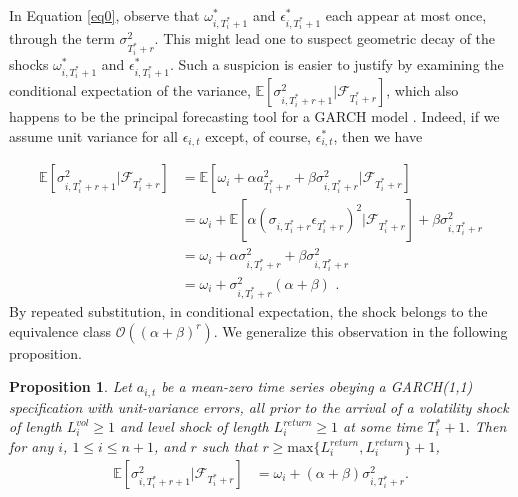 \documentclass{uiucthesis2021}
\newtheorem{prop}{Proposition}
\theoremstyle{definition}
\begin{document}
In Equation \eqref{eq0}, observe that $\omega_{i,T_{i}^{*}+1}^{*}$ and $\epsilon^{*}_{i,T_{i}^{*}+1}$ 
each appear at most once, through the term $\sigma^{2}_{T_{i}^{*}+r}$.  This might lead one to 
suspect  geometric decay of the shocks $\omega_{i,T_{i}^{*}+1}^{*}$ and $\epsilon^{*}_{i,T_{i}^{*}+1}$.  
Such a suspicion is easier to justify by examining the conditional expectation of the variance, 
$\mathbb{E}[ \sigma^{2}_{i,T_{i}^{*}+r+1} |\mathcal{F}_{T_{i}^{*}+r}]$, which also happens to be the principal forecasting tool for a GARCH model \citep{zivot2009practical}.  Indeed, if we assume unit variance for all $\epsilon_{i,t}$ except, of course, $\epsilon^{*}_{i,t}$, then we have

\begin{align*}
\mathbb{E}[ \sigma^{2}_{i,T_{i}^{*}+r+1} |\mathcal{F}_{T_{i}^{*}+r}] & = \mathbb{E}[\omega_{i} + \alpha a_{T_{i}^{*}+r}^{2} + \beta\sigma^{2}_{i,T_{i}^{*}+r} |\mathcal{F}_{T_{i}^{*}+r}] \\
& = \omega_{i} + \mathbb{E}[\alpha(\sigma_{i,T_{i}^{*}+r}\epsilon_{T_{i}^{*}+r})^{2} |\mathcal{F}_{T_{i}^{*}+r}] + \beta\sigma^{2}_{i,T_{i}^{*}+r} \\
& = \omega_{i} + \alpha\sigma_{i,T_{i}^{*}+r}^{2} + \beta\sigma^{2}_{i,T_{i}^{*}+r} \tag{Due to the unit variance assumption}\\
& = \omega_{i} + \sigma^{2}_{i,T_{i}^{*}+r}(\alpha + \beta) \text{ .} 
\end{align*}
By repeated substitution, in conditional expectation, the shock belongs to the equivalence class $\mathcal{O}((\alpha+\beta)^{r})$.  We generalize this observation in the following proposition.

\begin{prop}\label{decay_prop}
Let $a_{i,t}$ be a mean-zero time series obeying a GARCH(1,1) specification with unit-variance errors, all prior to the arrival of a volatility shock of length $L_{i}^{vol} \geq 1$ and level shock of length $L_{i}^{return}\geq 1$ at some time $T_{i}^{*}+1$.  Then for any $i$, $1\leq i \leq n+1$, and $r$ such that $r \geq \text{max}\{L_{i}^{return},L_{i}^{return}\} + 1$, 
\begin{align*}
\mathbb{E}[ \sigma^{2}_{i,T_{i}^{*}+r+1} |\mathcal{F}_{T_{i}^{*}+r}] & = \omega_{i} + (\alpha + \beta)\sigma^{2}_{i,T_{i}^{*}+r}.
\end{align*}
\end{prop}
\end{document}
